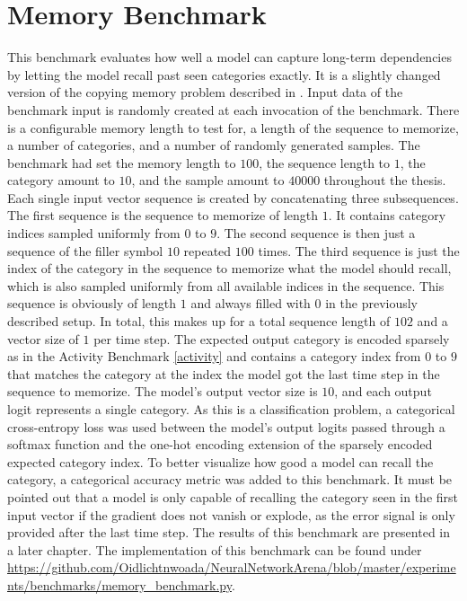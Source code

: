 \documentclass[draft,final]{vutinfth} %
\begin{document}
    \section{Memory Benchmark} \label{memory}
    This benchmark evaluates how well a model can capture long-term dependencies by letting the model recall past seen categories exactly.
    It is a slightly changed version of the copying memory problem described in \cite{UnitaryRNNs}.
    Input data of the benchmark input is randomly created at each invocation of the benchmark.
    There is a configurable memory length to test for, a length of the sequence to memorize, a number of categories, and a number of randomly generated samples.
    The benchmark had set the memory length to $100$, the sequence length to $1$, the category amount to $10$, and the sample amount to $40000$ throughout the thesis.
    Each single input vector sequence is created by concatenating three subsequences.
    The first sequence is the sequence to memorize of length $1$.
    It contains category indices sampled uniformly from $0$ to $9$.
    The second sequence is then just a sequence of the filler symbol $10$ repeated $100$ times.
    The third sequence is just the index of the category in the sequence to memorize what the model should recall, which is also sampled uniformly from all available indices in the sequence.
    This sequence is obviously of length $1$ and always filled with $0$ in the previously described setup.
    In total, this makes up for a total sequence length of $102$ and a vector size of $1$ per time step. 
    The expected output category is encoded sparsely as in the Activity Benchmark \ref{activity} and contains a category index from $0$ to $9$ that matches the category at the index the model got the last time step in the sequence to memorize.
    The model's output vector size is $10$, and each output logit represents a  single category.
    As this is a classification problem, a categorical cross-entropy loss was used between the model's output logits passed through a softmax function and the one-hot encoding extension of the sparsely encoded expected category index.
    To better visualize how good a model can recall the category, a categorical accuracy metric was added to this benchmark.
    It must be pointed out that a model is only capable of recalling the category seen in the first input vector if the gradient does not vanish or explode, as the error signal is only provided after the last time step.
    The results of this benchmark are presented in a later chapter.
    The implementation of this benchmark can be found under \url{https://github.com/Oidlichtnwoada/NeuralNetworkArena/blob/master/experiments/benchmarks/memory_benchmark.py}.
\end{document}
